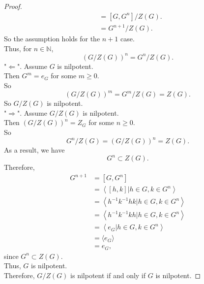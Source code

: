 \documentclass{amsart}
\newcommand{\bbn}{\mathbb{N}}
\theoremstyle{plain}
\theoremstyle{definition}
\begin{document}
\begin{proof}
\begin{align*}
  	  			 &=[G,G^n]/Z(G).\\
  	  			 &=G^{n+1}/Z(G).
	\end{align*}
	So the assumption holds for the $n+1$ case.\\
	Thus, for $n \in \bbn$,
	\[({G/Z(G)})^n = G^n/Z(G).\]
	"$\Leftarrow$". Assume $G$ is nilpotent.\\
	Then $G^m = e_G$ for some $m \geq 0$.\\
	So
	\[({G/Z(G)})^m = G^m/Z(G) = Z(G).\]
	So $G/Z(G)$ is nilpotent.\\
	"$\Rightarrow$". Assume $G/Z(G)$ is nilpotent.\\
	Then $(G/Z(G))^n = Z_G$ for some $n \geq 0$.\\
	So
	\[G^n/Z(G) = ({G/Z(G)})^n = Z(G).\]
	As a result, we have 
	\[G^n \subset Z(G).\]
	Therefore,
	\begin{align*}
	 	G^{n+1} &= [G,G^n] \\
				&=\left\langle [h, k]|h \in G, k \in G^n \right\rangle \\
				&=\left\langle h^{-1}k^{-1}hk|h \in G, k \in G^n \right\rangle \\
				&=\left\langle h^{-1}k^{-1}kh|h \in G, k \in G^n \right\rangle \\
				&=\left\langle e_G|h \in G, k \in G^n \right\rangle \\
	  			&=\langle e_G \rangle \\
	  			&= e_G,
  	\end{align*}
  	since $G^n \subset Z(G)$.\\
	Thus, $G$ is nilpotent.\\
Therefore, $G/Z(G)$ is nilpotent if and only if $G$ is nilpotent.
 \end{proof}
\end{document}
